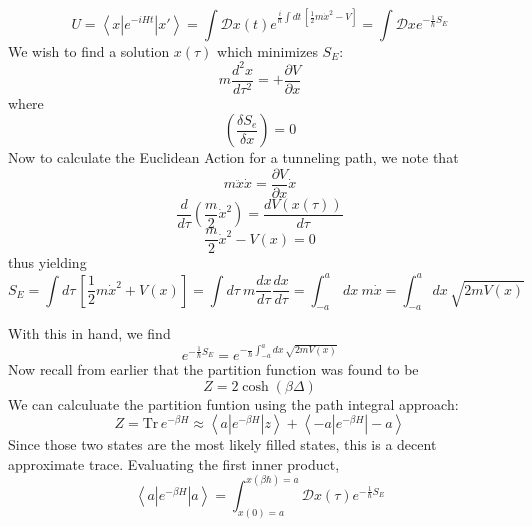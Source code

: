 \documentclass{article}
\begin{document}
	$$U=\left<x\left|e^{-iHt}\right|x'\right>=\int\mathcal{D}x(t)e^{\frac{i}{\hbar}\int dt\,\left[\frac{1}{2}m\dot{x}^2-V\right]}=\int\mathcal{D}xe^{-\frac{1}{\hbar}S_E}$$
	We wish to find a solution $x(\tau)$ which minimizes $S_E$:
	$$m\frac{d^2x}{d\tau^2}=+\frac{\partial V}{\partial x}$$
	where
	$$\left(\frac{\delta S_e}{\delta x}\right)=0$$
	Now to calculate the Euclidean Action for a tunneling path, we note that 
	$$m\ddot{x}\dot{x}=\frac{\partial V}{\partial x}\dot{x}$$
	$$\frac{d}{d\tau}\left(\frac{m}{2}\dot{x}^2\right)=\frac{dV(x(\tau))}{d\tau}$$
	$$\frac{m}{2}\dot{x}^2-V(x)=0$$
	thus yielding
	$$S_E=\int d\tau\,\left[\frac{1}{2}m\dot{x}^2+V(x)\right]=\int d\tau\ m\frac{dx}{d\tau}\frac{dx}{d\tau}=\int_{-a}^a\,dx\ m\dot{x}=\int_{-a}^adx\,\sqrt{2mV(x)}$$
	\begin{center}

	\end{center}
	With this in hand, we find
	$$e^{-\frac{1}{\hbar}S_E}=e^{-\frac{}{\hbar}\int_{-a}^adx\,\sqrt{2mV(x)}}$$
	Now recall from earlier that the partition function was found to be
	$$Z=2\cosh(\beta\Delta)$$
	We can calculuate the partition funtion using the path integral approach:
	$$Z=\mathrm{Tr}\,e^{-\beta H}\approx\left<a\left|e^{-\beta H}\right|z\right>+\left<-a\left|e^{-\beta H}\right|-a\right>$$
	Since those two states are the most likely filled states, this is a decent approximate trace. Evaluating the first inner product,
	$$\left<a\left|e^{-\beta H}\right|a\right>=\int_{x(0)=a}^{x(\beta\hbar)=a} \mathcal{D}x(\tau)e^{-\frac{1}{\hbar}S_E}$$
\end{document}
